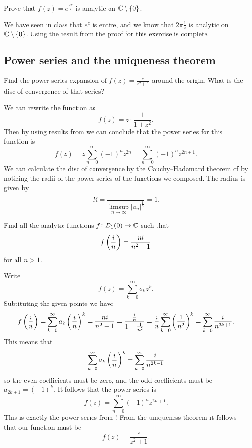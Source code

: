 \documentclass[11pt,a4paper]{article}
\begin{document}
\begin{exercise}
  Prove that $f(z) = e^{\frac{2 \pi}{z}}$ is analytic on $\mathbb{C} \setminus \left\{0\right\}$.
\end{exercise}
\begin{solution}
  We have seen in class that $e^z$ is entire,
  and we know that $2\pi \frac{1}{z}$ is analytic on $\mathbb{C} \setminus \left\{0\right\}$.
  Using the result from 
  the proof for this exercise is complete.
\end{solution}

\subsection{Power series and the uniqueness theorem}
\begin{exercise}
  \label{ex:power-series-calc}
  Find the power series expansion of $f(z) = \frac{z}{z^2 + 1}$ around the
  origin.
  What is the disc of convergence of that series?
\end{exercise}
\begin{solution}
  We can rewrite the function as
  \[
    f(z) = z \cdot \frac{1}{1 + z^2}.
  \]
  Then by using results from 
  we can conclude that the power series for this function is
  \[
    f(z) =
    z \sum_{n=0}^{\infty} (-1)^n z^{2n} =
    \sum_{n=0}^{\infty} (-1)^n z^{2n + 1}.
  \]
  We can calculate the disc of convergence by the Cauchy--Hadamard theorem
  of by noticing the radii of the power series of the functions we composed.
  The radius is given by
  \[
    R = \frac{1}{\limsup\limits_{n \to \infty} |a_n|^{\frac{1}{n}}} = 1.
  \]
\end{solution}

\begin{exercise}
  \label{ex:find-all-function-st}
  Find all the analytic functions $f \colon D_1(0) \to \mathbb{C}$ such that
  \[
    f\del{\frac{i}{n}} = \frac{n i}{n^2 - 1}
  \]
  for all $n > 1$.
\end{exercise}
\begin{solution}
  Write
  \[
    f(z) = \sum_{k=0}^{\infty} a_k z^k.
  \]
  Subtituting the given points we have
  \[
    f\del{\frac{i}{n}} =
    \sum_{k=0}^{\infty} a_k \del{\frac{i}{n}}^k =
    \frac{n i}{n^2 - 1} =
    \frac{\frac{i}{n}}{1 - \frac{1}{n^2}} =
    \frac{i}{n} \sum_{k=0}^{\infty} \del{\frac{1}{n^2}}^k =
    \sum_{k=0}^{\infty} \frac{i}{n^{2k+1}}.
  \]
  This means that
  \[
    \sum_{k=0}^{\infty} a_k \del{\frac{i}{n}}^k =
    \sum_{k=0}^{\infty} \frac{i}{n^{2k+1}}
  \]
  so the even coefficients must be zero,
  and the odd coefficients must be $a_{2k+1} = (-1)^k$.
  It follows that the power series is
  \[
    f(z) =
    \sum_{n=0}^{\infty} (-1)^n z^{2n + 1}.
  \]
  This is exactly the power series from !
  From the uniqueness theorem it follows that our function must be
  \[
    f(z) = \frac{z}{z^2 + 1}.
  \]
\end{solution}
\end{document}
